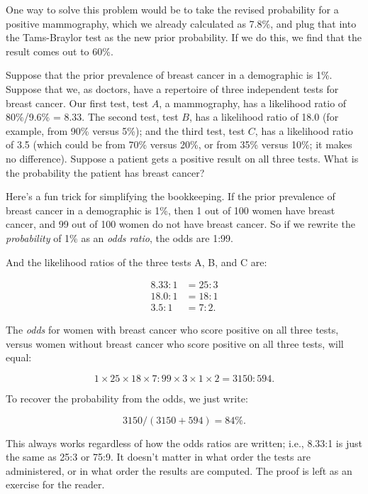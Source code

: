 { One way to solve this problem would be to take the revised
probability for a positive mammography, which we already calculated as
7.8\%, and plug that into the Tams-Braylor test as the new prior
probability. If we do this, we find that the result comes out to 60\%.


 Suppose that the prior prevalence of breast cancer in a
demographic is 1\%. Suppose that we, as doctors, have a repertoire of
three independent tests for breast cancer. Our first test, test $A$, a
mammography, has a likelihood ratio of 80\%/9.6\% = 8.33. The second
test, test $B$, has a likelihood ratio of 18.0 (for example, from 90\%
versus 5\%); and the third test, test $C$, has a likelihood ratio of 3.5
(which could be from 70\% versus 20\%, or from 35\% versus 10\%; it
makes no difference). Suppose a patient gets a positive result on all
three tests. What is the probability the patient has breast cancer?


 Here's a fun trick for simplifying the
bookkeeping. If the prior prevalence of breast cancer in a demographic
is 1\%, then 1 out of 100 women have breast cancer, and 99 out of 100
women do not have breast cancer. So if we rewrite the
\textit{probability} of 1\% as an \textit{odds ratio}, the odds are
1:99.


 And the likelihood ratios of the three tests A, B, and C are:

\begin{align*}
 8.33:1 &= 25:3\\
 18.0:1 &= 18:1\\
 3.5:1 &= 7:2.
\end{align*}


 The \textit{odds} for women with breast cancer who score positive
on all three tests, versus women without breast cancer who score
positive on all three tests, will equal:

\begin{equation*}
 1 \times 25 \times 18 \times 7 : 99 \times 3 \times 1 \times 2 = 3150 : 594.
\end{equation*}


 To recover the probability from the odds, we just write:

\begin{equation*}
 3150 / (3150 + 594) = 84\%.
\end{equation*}



 This always works regardless of how the odds ratios are written;
i.e., 8.33:1 is just the same as 25:3 or 75:9. It
doesn't matter in what order the tests are
administered, or in what order the results are computed. The proof is
left as an exercise for the reader.

}
